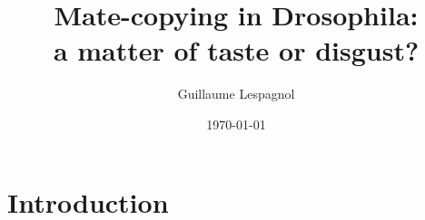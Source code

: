 \documentclass[a4paper, 12pt]{article}
\title{\Huge Mate-copying in Drosophila:\\ a matter of taste or disgust?}
\author{Guillaume Lespagnol}
\date{\today}
\begin{document}
	
	\maketitle
	
	\tableofcontents
	
	\bigskip
	
	
	\parencite{}
	
	
	
	
	\section{Introduction}
\end{document}
